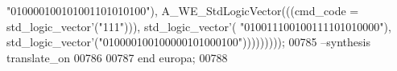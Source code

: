 \begin{DoxyCode}
{      "010000100101001101010100"}\textcolor{vhdlchar}{)}\textcolor{vhdlchar}{,} \textcolor{vhdlchar}{A\_WE\_StdLogicVector}\textcolor{vhdlchar}{(}\textcolor{vhdlchar}{(}\textcolor{vhdlchar}{(}\textcolor{vhdlchar}{cmd_code} \textcolor{vhdlchar}{=} \textcolor{comment}{std\_logic\_vector}\textcolor{vhdlchar}{'}\textcolor{vhdlchar}{(}\textcolor{vhdllogic}{"111"}\textcolor{vhdlchar}{)}\textcolor{vhdlchar}{)}\textcolor{vhdlchar}{)}\textcolor{vhdlchar}{,} \textcolor{comment}{std\_logic\_vector}\textcolor{vhdlchar}{'}\textcolor{vhdlchar}{(}\textcolor{vhdllogic}{
      "010011100100111101010000"}\textcolor{vhdlchar}{)}\textcolor{vhdlchar}{,} \textcolor{comment}{std\_logic\_vector}\textcolor{vhdlchar}{'}\textcolor{vhdlchar}{(}\textcolor{vhdllogic}{"010000100100000101000100"}\textcolor{vhdlchar}{)}\textcolor{vhdlchar}{)}\textcolor{vhdlchar}{)}\textcolor{vhdlchar}{)}\textcolor{vhdlchar}{)}\textcolor{vhdlchar}{)}\textcolor{vhdlchar}{)}\textcolor{vhdlchar}{)}\textcolor{vhdlchar}{)};
00785 \textcolor{keyword}{--synthesis translate\_on}
00786 
00787 \textcolor{keywordflow}{end} \textcolor{vhdlchar}{europa};
00788 
\end{DoxyCode}
